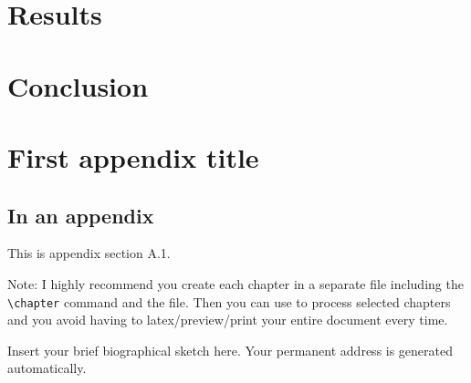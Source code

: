 \documentclass[11pt]{afthesis}
\begin{document}
	
	
	
	\chapter{Results}
	
	\chapter{Conclusion}
	
	
	\appendix		%
	
	\chapter{First appendix title}
	
	\section{In an appendix} 
	
	This is appendix section A.1.
	
	Note: I highly recommend you create each chapter in a separate file
	including the \verb|\chapter| command and \verb|| the file.
	Then you can use \verb|| to process selected chapters and
	you avoid having to latex/preview/print your entire document every
	time.
	
	
	
	
	
	
	\begin{vita}
		Insert your brief biographical sketch here. Your permanent
		address is generated automatically.
	\end{vita}
	
	
\end{document}
